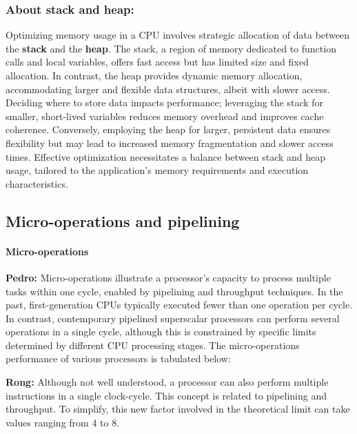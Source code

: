 \documentclass{article}
\begin{document}
       
        \subsubsection{About stack and heap:} Optimizing memory usage in a CPU involves strategic allocation of data between the \textbf{stack} and the \textbf{heap}. The stack, a region of memory dedicated to function calls and local variables, offers fast access but has limited size and fixed allocation. In contrast, the heap provides dynamic memory allocation, accommodating larger and flexible data structures, albeit with slower access. Deciding where to store data impacts performance; leveraging the stack for smaller, short-lived variables reduces memory overhead and improves cache coherence. Conversely, employing the heap for larger, persistent data ensures flexibility but may lead to increased memory fragmentation and slower access times. Effective optimization necessitates a balance between stack and heap usage, tailored to the application's memory requirements and execution characteristics.
      


    

    
    \subsection{Micro-operations and pipelining}
        \paragraph{Micro-operations}
        \textbf{Pedro:} Micro-operations illustrate a processor’s capacity to process multiple tasks within one cycle, enabled by pipelining and throughput techniques.
        In the past, first-generation CPUs typically executed fewer than one operation per cycle. In contrast, contemporary pipelined superscalar processors can perform several operations in a single cycle, although this is constrained by specific limits determined by different CPU processing stages.
        The micro-operations performance of various processors is tabulated below:

        \textbf{Rong:} Although not well understood, a processor can also perform multiple instructions in a single clock-cycle. This concept is related to pipelining and throughput. To simplify, this new factor involved in the theoretical limit can take values ranging from 4 to 8.
\end{document}
